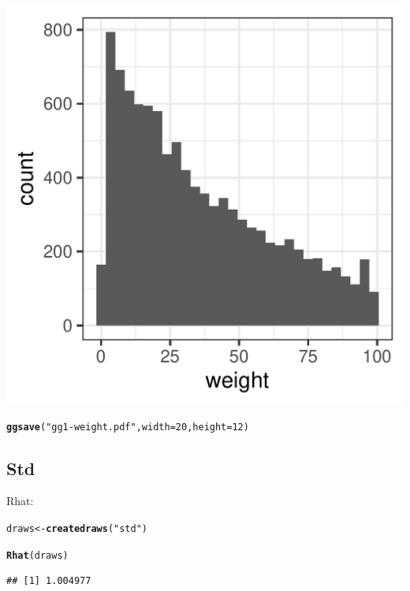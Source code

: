 \documentclass{article}\usepackage[]{graphicx}\usepackage[]{color}
\makeatletter
\def\maxwidth{ %
  \ifdim\Gin@nat@width>\linewidth
    \linewidth
  \else
    \Gin@nat@width
  \fi
}
\newcommand{\hlnum}[1]{\textcolor[rgb]{0.686,0.059,0.569}{#1}}%
\newcommand{\hlstr}[1]{\textcolor[rgb]{0.192,0.494,0.8}{#1}}%
\newcommand{\hlstd}[1]{\textcolor[rgb]{0.345,0.345,0.345}{#1}}%
\newcommand{\hlkwb}[1]{\textcolor[rgb]{0.69,0.353,0.396}{#1}}%
\newcommand{\hlkwc}[1]{\textcolor[rgb]{0.333,0.667,0.333}{#1}}%
\newcommand{\hlkwd}[1]{\textcolor[rgb]{0.737,0.353,0.396}{\textbf{#1}}}%
\newenvironment{kframe}{%
 \def\at@end@of@kframe{}%
 \ifinner\ifhmode%
  \def\at@end@of@kframe{\end{minipage}}%
  \begin{minipage}{\columnwidth}%
 \fi\fi%
 \def\FrameCommand##1{\hskip\@totalleftmargin \hskip-\fboxsep
 \colorbox{shadecolor}{##1}\hskip-\fboxsep
     \hskip-\linewidth \hskip-\@totalleftmargin \hskip\columnwidth}%
 \MakeFramed {\advance\hsize-\width
   \@totalleftmargin\z@ \linewidth\hsize
   \@setminipage}}%
 {\par\unskip\endMakeFramed%
 \at@end@of@kframe}
\newenvironment{knitrout}{}{} %
\makeatother
\begin{document}
\begin{knitrout}
\begin{kframe}
{\ttfamily\noindent\itshape\color{messagecolor}{\#\# `stat\_bin()` using `bins = 30`. Pick better value with `binwidth`.}}\end{kframe}
\includegraphics[width=\maxwidth]{figures/figure7regionsunnamed-chunk-19-1} 
\begin{kframe}\begin{alltt}
\hlkwd{ggsave}\hlstd{(}\hlstr{"gg1-weight.pdf"}\hlstd{,} \hlkwc{width} \hlstd{=} \hlnum{20}\hlstd{,} \hlkwc{height} \hlstd{=} \hlnum{12}\hlstd{)}
\end{alltt}


{\ttfamily\noindent\itshape\color{messagecolor}{\#\# `stat\_bin()` using `bins = 30`. Pick better value with `binwidth`.}}\end{kframe}
\end{knitrout}
\subsection{Std}

Rhat:
\begin{knitrout}
\color{fgcolor}\begin{kframe}
\begin{alltt}
\hlstd{draws} \hlkwb{<-} \hlkwd{createdraws}\hlstd{(}\hlstr{"std"}\hlstd{)}

\hlkwd{Rhat}\hlstd{(draws)}
\end{alltt}
\begin{verbatim}
## [1] 1.004977
\end{verbatim}
\end{kframe}
\end{knitrout}
\end{document}
